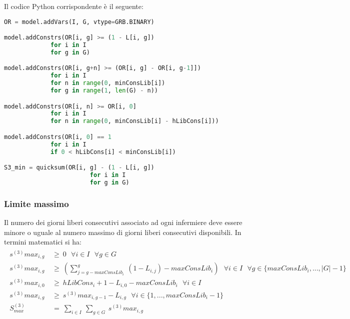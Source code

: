 Il codice Python corrispondente è il seguente:
\begin{lstlisting}[language=Python]
OR = model.addVars(I, G, vtype=GRB.BINARY)

model.addConstrs(OR[i, g] >= (1 - L[i, g])
             for i in I
             for g in G)

model.addConstrs(OR[i, g+n] >= (OR[i, g] - OR[i, g-1]])
             for i in I
             for n in range(0, minConsLib[i])
             for g in range(1, len(G) - n))

model.addConstrs(OR[i, n] >= OR[i, 0]
             for i in I
             for n in range(0, minConsLib[i] - hLibCons[i]))

model.addConstrs(OR[i, 0] == 1
             for i in I
             if 0 < hLibCons[i] < minConsLib[i])

S3_min = quicksum(OR[i, g] - (1 - L[i, g])
                        for i in I
                        for g in G)
\end{lstlisting}


\subsubsection{Limite massimo}
Il numero dei giorni liberi consecutivi associato ad ogni infermiere deve essere minore o uguale al numero massimo di giorni liberi consecutivi disponibili.
In termini matematici si ha:
\begin{gather}
\begin{aligned}
s^{(3)}max_{i, g} ~ &\geq ~ 0 ~~~ \forall i \in I ~~~ \forall g \in G \\ 
s^{(3)}max_{i, g} ~ &\geq ~ (\sum_{j=g-maxConsLib_i}^g ~ (1 - L_{i,j}) - maxConsLib_i) ~~~ \forall i \in I ~~~ \forall g \in \{maxConsLib_i,...,|G| - 1\} \\
s^{(3)}max_{i, 0} ~ &\geq ~ hLibCons_i + 1 - L_{i,0} - maxConsLib_i ~~~ \forall i \in I \\
s^{(3)}max_{i, g} ~ &\geq ~ s^{(3)}max_{i, g-1} -  L_{i,g} ~~~ \forall i \in \{1,...,maxConsLib_i - 1\} \\
S^{(3)}_{max} ~ &= ~ \sum_{i \in I} ~ \sum_{g \in G} ~ s^{(3)}max_{i, g} \\
\end{aligned}
\end{gather}

